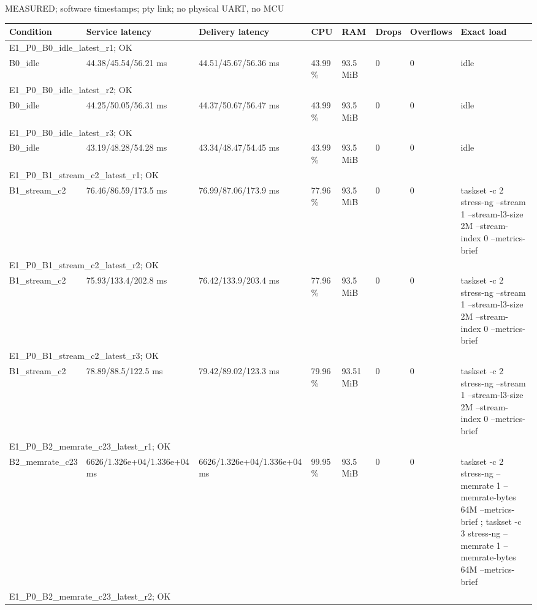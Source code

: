 \par\noindent MEASURED; software timestamps; pty link; no physical UART, no MCU\par
\begin{tabular}{llllllll}
\toprule
Condition & Service latency & Delivery latency & CPU & RAM & Drops & Overflows & Exact load \\
\midrule
\multicolumn{8}{l}{E1\_P0\_B0\_idle\_latest\_r1; OK} \\
B0\_idle & 44.38/45.54/56.21 ms & 44.51/45.67/56.36 ms & 43.99 \% & 93.5 MiB & 0 & 0 & idle \\
\multicolumn{8}{l}{E1\_P0\_B0\_idle\_latest\_r2; OK} \\
B0\_idle & 44.25/50.05/56.31 ms & 44.37/50.67/56.47 ms & 43.99 \% & 93.5 MiB & 0 & 0 & idle \\
\multicolumn{8}{l}{E1\_P0\_B0\_idle\_latest\_r3; OK} \\
B0\_idle & 43.19/48.28/54.28 ms & 43.34/48.47/54.45 ms & 43.99 \% & 93.5 MiB & 0 & 0 & idle \\
\multicolumn{8}{l}{E1\_P0\_B1\_stream\_c2\_latest\_r1; OK} \\
B1\_stream\_c2 & 76.46/86.59/173.5 ms & 76.99/87.06/173.9 ms & 77.96 \% & 93.5 MiB & 0 & 0 & taskset -c 2 stress-ng --stream 1 --stream-l3-size 2M --stream-index 0 --metrics-brief \\
\multicolumn{8}{l}{E1\_P0\_B1\_stream\_c2\_latest\_r2; OK} \\
B1\_stream\_c2 & 75.93/133.4/202.8 ms & 76.42/133.9/203.4 ms & 77.96 \% & 93.5 MiB & 0 & 0 & taskset -c 2 stress-ng --stream 1 --stream-l3-size 2M --stream-index 0 --metrics-brief \\
\multicolumn{8}{l}{E1\_P0\_B1\_stream\_c2\_latest\_r3; OK} \\
B1\_stream\_c2 & 78.89/88.5/122.5 ms & 79.42/89.02/123.3 ms & 79.96 \% & 93.51 MiB & 0 & 0 & taskset -c 2 stress-ng --stream 1 --stream-l3-size 2M --stream-index 0 --metrics-brief \\
\multicolumn{8}{l}{E1\_P0\_B2\_memrate\_c23\_latest\_r1; OK} \\
B2\_memrate\_c23 & 6626/1.326e+04/1.336e+04 ms & 6626/1.326e+04/1.336e+04 ms & 99.95 \% & 93.5 MiB & 0 & 0 & taskset -c 2 stress-ng --memrate 1 --memrate-bytes 64M --metrics-brief ; taskset -c 3 stress-ng --memrate 1 --memrate-bytes 64M --metrics-brief \\
\multicolumn{8}{l}{E1\_P0\_B2\_memrate\_c23\_latest\_r2; OK} \\

\end{tabular}
